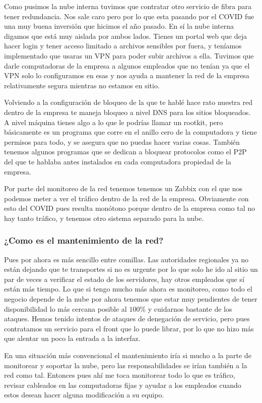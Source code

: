 \documentclass[../main.tex]{subfiles}
\begin{document}
\medskip

Como pusimos la nube interna tuvimos que contratar otro servicio de fibra para tener redundancia. Nos sale caro pero por lo que esta pasando por el COVID fue una muy buena inversión que hicimos el año pasado. En sí la nube interna digamos que está muy aislada por ambos lados. Tienes un portal web que deja hacer login y tener acceso limitado a archivos sensibles por fuera, y teníamos implementado que usaras un VPN para poder subir archivos a ella. Tuvimos que darle computadoras de la empresa a algunos empleados que no tenían ya que el VPN solo lo configuramos en esas y nos ayuda a mantener la red de la empresa relativamente segura mientras no estamos en sitio.

\medskip

Volviendo a la configuración de bloqueo de la que te hablé hace rato nuestra red dentro de la empresa te maneja bloqueo a nivel DNS para los sitios bloqueados. A nivel máquina tienes algo a lo que le podrías llamar un rootkit, pero básicamente es un programa que corre en el anillo cero de la computadora y tiene permisos para todo, y se asegura que no puedas hacer varias cosas. También tenemos algunos programas que se dedican a bloquear protocolos como el P2P del que te hablaba antes instalados en cada computadora propiedad de la empresa.

\medskip

Por parte del monitoreo de la red tenemos tenemos un Zabbix con el que nos podemos meter a ver el tráfico dentro de la red de la empresa. Obviamente con esto del COVID pues resulta monótono porque dentro de la empresa como tal no hay tanto tráfico, y tenemos otro sistema separado para la nube.

\medskip

\subsubsection*{¿Como es el mantenimiento de la red?}

Pues por ahora es más sencillo entre comillas. Las autoridades regionales ya no están dejando que te transportes si no es urgente por lo que solo he ido al sitio un par de veces a verificar el estado de los servidores, hay otros empleados que sí están más tiempo. Lo que si tengo mucho más ahora es monitoreo, como todo el negocio depende de la nube por ahora tenemos que estar muy pendientes de tener disponibilidad lo más cercana posible al \(100\%\) y cuidarnos bastante de los ataques. Hemos tenido intentos de ataques de denegación de servicio, pero pues contratamos un servicio para el front que lo puede librar, por lo que no hizo más que alentar un poco la entrada a la interfaz.

\medskip

En una situación más convencional el mantenimiento iría si mucho a la parte de monitorear y soportar la nube, pero las responsabilidades se irían también a la red como tal. Entonces pues ahí me toca monitorear todo lo que es tráfico, revisar cableados en las computadoras fijas y ayudar a los empleados cuando estos desean hacer alguna modificación a su equipo.
\end{document}
